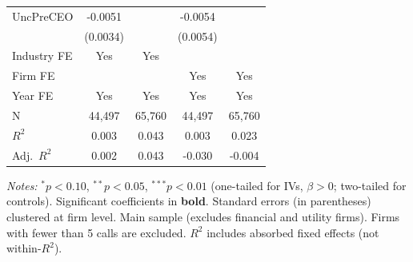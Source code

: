 \begin{landscape}
\begin{table}[H]
\begin{tabular}{lcccc}
UncPreCEO & -0.0051 &  & -0.0054 &  \\
 & (0.0034) &  & (0.0054) &  \\
\midrule
Industry FE & Yes & Yes &  &  \\
Firm FE &  &  & Yes & Yes \\
Year FE & Yes & Yes & Yes & Yes \\
\midrule
N & 44,497 & 65,760 & 44,497 & 65,760 \\
$R^2$ & 0.003 & 0.043 & 0.003 & 0.023 \\
Adj.~$R^2$ & 0.002 & 0.043 & -0.030 & -0.004 \\
\bottomrule
\end{tabular}
\begin{minipage}{\linewidth}
\vspace{2pt}\scriptsize
\textit{Notes:} $^{*}p<0.10$, $^{**}p<0.05$, $^{***}p<0.01$ (one-tailed for IVs, $\beta > 0$; two-tailed for controls).
 Significant coefficients in \textbf{bold}.
 Standard errors (in parentheses) clustered at firm level.
 Main sample (excludes financial and utility firms). Firms with fewer than 5 calls are excluded.
 $R^2$ includes absorbed fixed effects (not within-$R^2$).
\end{minipage}
\end{table}
\end{landscape}